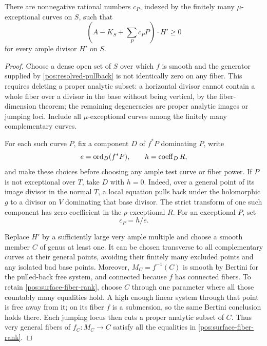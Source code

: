 \begin{lemma}\label{pos:surface-inequality}
There are nonnegative rational numbers \(c_P\), indexed by the
finitely many \(\mu\)-exceptional curves on \(S\), such that
\begin{equation}\label{pos:surface-intersection}
 \left(A-K_S+\sum_Pc_PP\right)\cdot H'\geq0
\end{equation}
for every ample divisor \(H'\) on \(S\).
\end{lemma}

\begin{proof}
Choose a dense open set of \(S\) over which \(f\) is smooth and the
generator supplied by \eqref{pos:resolved-pullback} is not identically
zero on any fiber. This requires deleting a proper analytic subset:
a horizontal divisor cannot contain a whole fiber over a divisor in
the base without being vertical, by the fiber-dimension theorem; the
remaining degeneracies are proper analytic images or jumping loci.
Include all \(\mu\)-exceptional curves among the finitely many
complementary curves.

For each such curve \(P\), fix a component \(D\) of \(f^*P\)
dominating \(P\), write
\[
 e=\operatorname{ord}_D(f^*P),\qquad h=\operatorname{coeff}_D R,
\]
and make these choices before choosing any ample test curve or fiber
power. If \(P\) is not exceptional over \(T\), take \(D\) with
\(h=0\). Indeed, over a general point of its image divisor in the
normal \(T\), a local equation pulls back under the holomorphic
\(g\) to a divisor on \(V\) dominating that base divisor. The strict
transform of one such component has zero coefficient in the
\(p\)-exceptional \(R\). For an exceptional \(P\), set
\begin{equation}\label{pos:exceptional-pole-allowance}
 c_P=h/e.
\end{equation}

Replace \(H'\) by a sufficiently large very ample multiple and choose
a smooth member \(C\) of genus at least one. It can be chosen
transverse to all complementary curves at their general points,
avoiding their finitely many excluded points and any isolated bad
base points. Moreover, \(M_C=f^{-1}(C)\) is smooth by Bertini for
the pulled-back free system, and connected because \(f\) has connected
fibers. To retain \eqref{pos:surface-fiber-rank}, choose \(C\) through
one parameter where all those countably many equalities hold. A high
enough linear system through that point is free away from it; on its
fiber \(f\) is a submersion, so the same Bertini conclusion holds
there. Each jumping locus then cuts a proper analytic subset of
\(C\). Thus very general fibers of \(f_C:M_C\to C\) satisfy all
the equalities in \eqref{pos:surface-fiber-rank}.


\end{proof}
